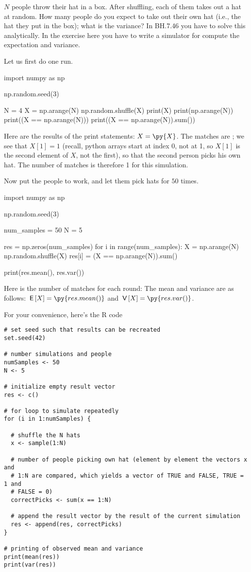 \begin{exercise}
$N$ people throw their hat in a box. After shuffling, each of them takes out a hat at random. How many people do you expect to take out their own hat (i.e., the hat they put in the box); what is the variance? In BH.7.46 you have to solve this analytically. In the exercise here you have to write a simulator for compute the expectation and variance.
\begin{solution}
Let us first do one run.
\begin{pyblock}[][numbers=left,frame=lines]
import numpy as np

np.random.seed(3)

N = 4
X = np.arange(N)
np.random.shuffle(X)
print(X)
print(np.arange(N))
print((X == np.arange(N)))
print((X == np.arange(N)).sum())
\end{pyblock}
Here are the results of the print statements: $X = \py{X}$. The matches are ; we see that $X[1] = 1$ (recall, python arrays start at index 0, not at 1, so $X[1]$ is the second element of $X$, not the first), so that the second person picks his own hat. The number of matches is therefore 1 for this simulation.

Now put the people to work, and let them pick hats for $50$ times.
\begin{pyblock}[][numbers=left,frame=lines]
import numpy as np

np.random.seed(3)

num_samples = 50
N = 5

res = np.zeros(num_samples)
for i in range(num_samples):
    X = np.arange(N)
    np.random.shuffle(X)
    res[i] = (X == np.arange(N)).sum()

print(res.mean(), res.var())
\end{pyblock}
Here is the number of matches for each round: 
The mean and variance are as follows: $\E X = \py{res.mean()}$ and $\V X = \py{res.var()}$.

For your convenience, here's the R code
\begin{verbatim}
# set seed such that results can be recreated
set.seed(42)

# number simulations and people
numSamples <- 50
N <- 5

# initialize empty result vector
res <- c()

# for loop to simulate repeatedly
for (i in 1:numSamples) {

  # shuffle the N hats
  x <- sample(1:N)

  # number of people picking own hat (element by element the vectors x and
  # 1:N are compared, which yields a vector of TRUE and FALSE, TRUE = 1 and
  # FALSE = 0)
  correctPicks <- sum(x == 1:N)

  # append the result vector by the result of the current simulation
  res <- append(res, correctPicks)
}

# printing of observed mean and variance
print(mean(res))
print(var(res))
\end{verbatim}

\end{solution}
\end{exercise}




